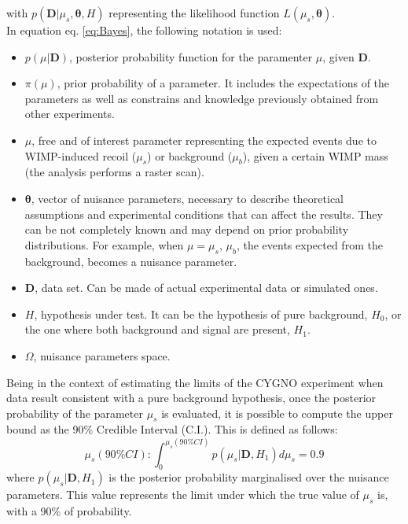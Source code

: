 \documentclass[physics,article,submit,moreauthors,pdftex]{Definitions/mdpi}
\begin{document}
with $p(\boldsymbol{D}\vert\mu_s,\boldsymbol{\theta},H)$ representing the likelihood function $L(\mu_s,\boldsymbol{\theta})$.\\
In equation eq. \ref{eq:Bayes}, the following notation is used:
\begin{itemize}
    \item $p(\mu\vert\boldsymbol{D})$, posterior probability function for the paramenter $\mu$, given $\boldsymbol{D}$.
    \item $\pi(\mu)$, prior probability of a parameter. It includes the expectations of the parameters as well as constrains and knowledge previously obtained from other experiments.
    \item $\mu$, free and of interest parameter representing the expected events due to WIMP-induced recoil ($\mu_s$) or background ($\mu_b$), given a certain WIMP mass (the analysis performs a raster scan).
    \item $\boldsymbol{\theta}$, vector of nuisance parameters, necessary to describe theoretical assumptions and experimental conditions that can affect the results. They can be not completely known and may depend on prior probability distributions. For example, when $\mu=\mu_s$, $\mu_b$, the events expected from the background, becomes a nuisance parameter.
    \item $\boldsymbol{D}$, data set. Can be made of actual experimental data or simulated ones.
    \item $H$, hypothesis under test. It can be the hypothesis of pure background, $H_0$, or the one where both background and signal are present, $H_1$.
    \item $\Omega$, nuisance parameters space.
\end{itemize}

Being in the context of estimating the limits of the CYGNO experiment when data result consistent with a pure background hypothesis, once the posterior probability of the parameter $\mu_s$ is evaluated, it is possible to compute the upper bound as the 90\% Credible Interval (C.I.). This is defined as follows:
\begin{equation}
\label{eq:CI}
 \mu_s(90\% CI): \int_{0}^{\mu_s(90\%CI)} p(\mu_s\vert\boldsymbol{D},H_1)d\mu_s=0.9
\end{equation}
where $p(\mu_s\vert\boldsymbol{D},H_1)$ is the posterior probability marginalised over the nuisance parameters. This value represents the limit under which the true value of $\mu_s$ is, with a 90\% of probability.\\
\end{document}
